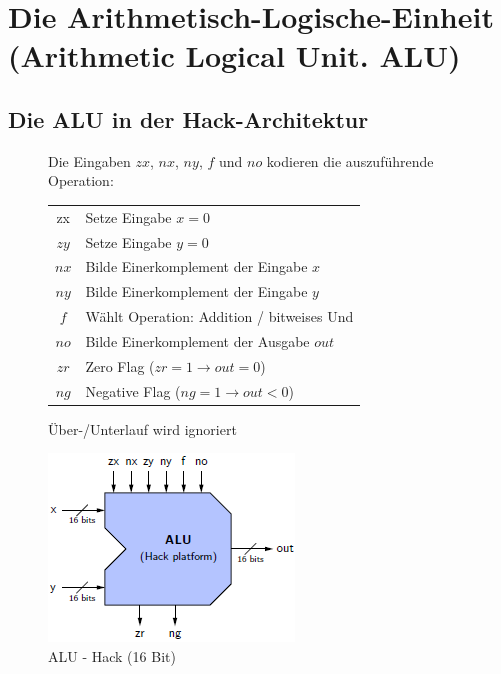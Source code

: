 \documentclass[12pt]{report}
\begin{document}
\section{Die Arithmetisch-Logische-Einheit (Arithmetic Logical Unit. ALU)}
\subsection{Die ALU in der Hack-Architektur}
\begin{figure}[H]
  \begin{minipage}[t]{0.5\textwidth}
    Die Eingaben $zx$, $nx$, $ny$, $f$ und $no$ kodieren die auszuführende Operation:
    
    \begin{table}[H]
      \begin{tabular}{Cl}
        zx   & Setze Eingabe $x=0$                        \\
        $zy$ & Setze Eingabe $y=0$                        \\
        $nx$ & Bilde Einerkomplement der Eingabe $x$      \\
        $ny$ & Bilde Einerkomplement der Eingabe $y$      \\
        $f$  & Wählt Operation: Addition / bitweises Und  \\
        $no$ & Bilde Einerkomplement der Ausgabe $out$    \\
        $zr$ & Zero Flag ($zr=1 \rightarrow out = 0$)     \\
        $ng$ & Negative Flag ($ng=1 \rightarrow out < 0$)
      \end{tabular}
    \end{table}
    
    Über-/Unterlauf wird ignoriert
  \end{minipage}
  \hfill
  \begin{minipage}[t]{0.4\textwidth}
    \caption{ALU - Hack (16 Bit)}
    \label{fig:alu_der_hack-platform}
    \centering
    \includegraphics[width=\textwidth]{alu_der_hack-platform}
  \end{minipage}
\end{figure}
\end{document}
